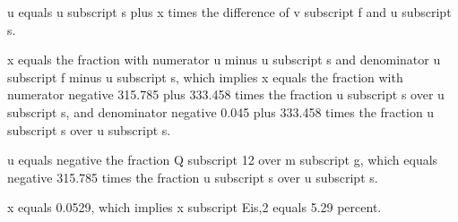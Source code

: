 u equals u subscript s plus x times the difference of v subscript f and u subscript s.

x equals the fraction with numerator u minus u subscript s and denominator u subscript f minus u subscript s, which implies x equals the fraction with numerator negative 315.785 plus 333.458 times the fraction u subscript s over u subscript s, and denominator negative 0.045 plus 333.458 times the fraction u subscript s over u subscript s.

u equals negative the fraction Q subscript 12 over m subscript g, which equals negative 315.785 times the fraction u subscript s over u subscript s.

x equals 0.0529, which implies x subscript Eis,2 equals 5.29 percent.